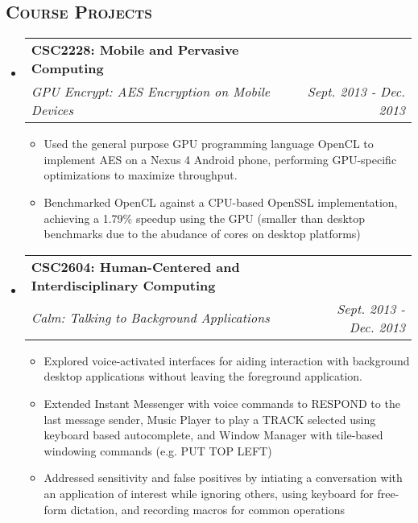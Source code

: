 \documentclass[letterpaper,11pt]{article}
\makeatletter
\newcommand{\company}[1]{
    \textbf{#1}
}
\newcommand{\heading}[1]{
    \textsc{\textbf{#1}}
}
\newcommand*\resheading[1]{\subsection*{\heading{#1}}\vspace{0.3em}\nopagebreak[4]}
\newcommand{\resitem}[1]{\item #1 \vspace{-2pt}}
\newcommand{\ressubheading}[4]{
\begin{tabular*}{6.5in}{l@{\extracolsep{\fill}}r}
    
		\company{#1} & #2 \\
		\textit{#3} & \textit{#4} \\
\end{tabular*}\vspace{-6pt}}
\makeatother
\begin{document}
\resheading{Course Projects}
\begin{itemize}

\item

	\ressubheading{CSC2228: Mobile and Pervasive Computing}{}{GPU Encrypt: AES Encryption on Mobile Devices}{Sept. 2013 - Dec. 2013}
	\begin{itemize}
		\resitem{
            Used the general purpose GPU programming language OpenCL to implement AES on a 
            Nexus 4 Android phone, performing GPU-specific optimizations to maximize 
            throughput.
        }
		\resitem{
            Benchmarked OpenCL against a CPU-based OpenSSL implementation, achieving a 
            1.79\% speedup using the GPU (smaller than desktop benchmarks due to the 
            abudance of cores on desktop platforms)
        }
	\end{itemize}

\item
	\ressubheading{CSC2604: Human-Centered and Interdisciplinary Computing}{}{Calm: Talking to Background Applications}{Sept. 2013 - Dec. 2013}
	\begin{itemize}
		\resitem{
            Explored voice-activated interfaces for aiding interaction with background 
            desktop applications without leaving the foreground application.
        }
		\resitem{
            Extended Instant Messenger with voice commands to RESPOND to the last message 
            sender, Music Player to play a TRACK selected using keyboard based 
            autocomplete, and Window Manager with tile-based windowing commands (e.g. PUT 
            TOP LEFT)
        }
		\resitem{
            Addressed sensitivity and false positives by intiating a conversation with an 
            application of interest while ignoring others, using keyboard for free-form 
            dictation, and recording macros for common operations
        }
	\end{itemize}

\end{itemize}
\end{document}
